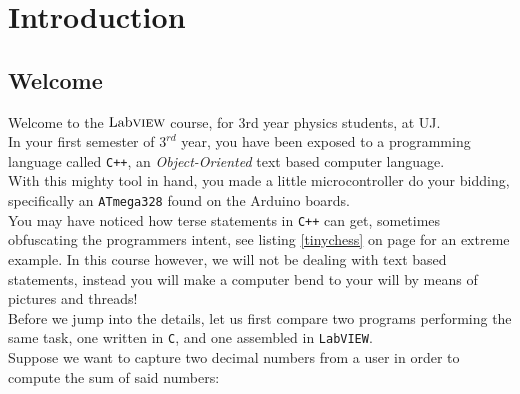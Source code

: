 \chapter{Introduction}

\section{Welcome}
	Welcome to the $\text{Lab}\textsc{view}$ course, for 3rd year physics students, at UJ.\\
	In your first semester of $3^{rd}$ year, you have been exposed to a programming language called \texttt{C++}, an \textit{Object-Oriented} text based computer language.\\
	With this mighty tool in hand, you made a little microcontroller do your bidding, specifically an \texttt{ATmega328} found on the Arduino boards.\\
	
	You may have noticed how terse statements in \texttt{C++} can get, sometimes obfuscating the programmers intent, see listing \ref{tinychess} on page \pageref{tinychess} for an extreme example. In this course however, we will not be dealing with text based statements, instead you will make a computer bend to your will by means of pictures and threads!\\
	
	Before we jump into the details, let us first compare two programs performing the same task, one written in \texttt{C}, and one assembled in \texttt{LabVIEW}.\\
	Suppose we want to capture two decimal numbers from a user in order to compute the sum of said numbers:
	
